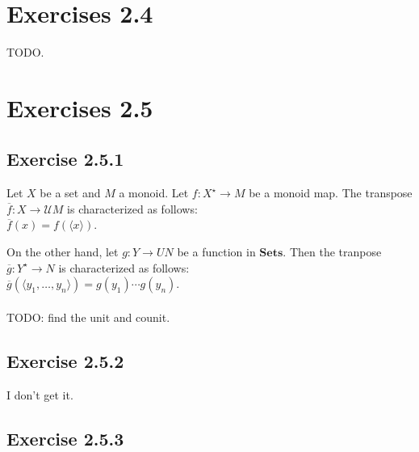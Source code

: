 \documentclass{article}
\newcommand{\mbf}{\mathbf}
\begin{document}
\section*{Exercises 2.4}

TODO.

\section*{Exercises 2.5}

\subsection*{Exercise 2.5.1}

Let $X$ be a set and $M$ a monoid. Let $f : X^\star \to M$ be a monoid map. The transpose $\overline{f} : X \to \mathcal UM$
is characterized as follows:\\
$\overline{f}(x) = f(\langle x \rangle)$.

On the other hand, let $g : Y \to UN$ be a function in $\mbf{Sets}$. Then the tranpose $\overline{g} : Y^\star \to N$ is
characterized as follows:\\
$\overline{g}(\langle y_1, \ldots, y_n \rangle) = g(y_1) \cdots g(y_n)$.\\~\\
TODO: find the unit and counit.

\subsection*{Exercise 2.5.2}

I don't get it.

\subsection*{Exercise 2.5.3}
\end{document}
